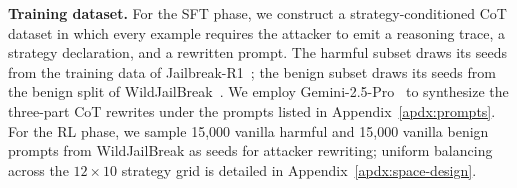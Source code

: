 \documentclass{article}
\newcommand{\strategyspace}{\mathcal{B}}
\begin{document}
\textbf{Training dataset.}\quad
For the SFT phase, we construct a strategy-conditioned CoT dataset in which every example requires the attacker to emit a reasoning trace, a strategy declaration, and a rewritten prompt. The harmful subset draws its seeds from the training data of Jailbreak-R1~\citep{wang2025jailbreakr1}; the benign subset draws its seeds from the benign split of WildJailBreak~\citep{jiang2024wildteaming}. We employ Gemini-2.5-Pro~\citep{comanici2025gemini} to synthesize the three-part CoT rewrites under the prompts listed in Appendix~\ref{apdx:prompts}. For the RL phase, we sample 15{,}000 vanilla harmful and 15{,}000 vanilla benign prompts from WildJailBreak as seeds for attacker rewriting; uniform balancing across the $12\times10$ strategy grid is detailed in Appendix~\ref{apdx:space-design}.
\label{sec:exp-data}
\end{document}
